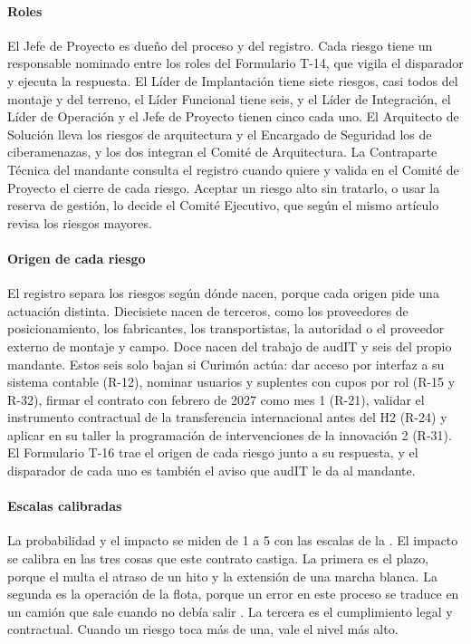 \paragraph{Roles}
El Jefe de Proyecto es dueño del proceso y del registro. Cada riesgo tiene un responsable nominado entre
los roles del Formulario T-14, que vigila el disparador y ejecuta la respuesta. El Líder de Implantación
tiene siete riesgos, casi todos del montaje y del terreno, el Líder Funcional tiene seis, y el Líder de
Integración, el Líder de Operación y el Jefe de Proyecto tienen cinco cada uno. El Arquitecto de Solución lleva los riesgos de arquitectura
y el Encargado de Seguridad los de ciberamenazas, y los dos integran el Comité de Arquitectura. La
Contraparte Técnica del mandante consulta el registro cuando quiere y valida en el Comité de Proyecto el
cierre de cada riesgo. Aceptar un riesgo alto sin tratarlo, o usar la reserva de gestión, lo decide el
Comité Ejecutivo, que según el mismo artículo revisa los riesgos mayores.

\paragraph{Origen de cada riesgo}
El registro separa los riesgos según dónde nacen, porque cada origen pide una actuación distinta.
Diecisiete nacen de terceros, como los proveedores de posicionamiento, los fabricantes, los transportistas,
la autoridad o el proveedor externo de montaje y campo. Doce nacen del trabajo de audIT y seis del propio mandante. Estos seis solo bajan si
Curimón actúa: dar acceso por interfaz a su sistema contable (R-12), nominar usuarios y suplentes con
cupos por rol (R-15 y R-32), firmar el contrato con febrero de 2027 como mes 1 (R-21), validar el
instrumento contractual de la transferencia internacional antes del H2 (R-24) y aplicar en su taller la programación de
intervenciones de la innovación 2 (R-31). El Formulario T-16 trae el origen de cada riesgo junto a su
respuesta, y el disparador de cada uno es también el aviso que audIT le da al mandante.

\paragraph{Escalas calibradas}
La probabilidad y el impacto se miden de 1 a 5 con las escalas de la . El impacto se
calibra en las tres cosas que este contrato castiga. La primera es el plazo, porque el  multa
el atraso de un hito y la extensión de una marcha blanca. La segunda es la operación de la flota, porque
un error en este proceso se traduce en un camión que sale cuando no debía salir
. La tercera es el cumplimiento legal y contractual. Cuando un riesgo toca más de
una, vale el nivel más alto.

